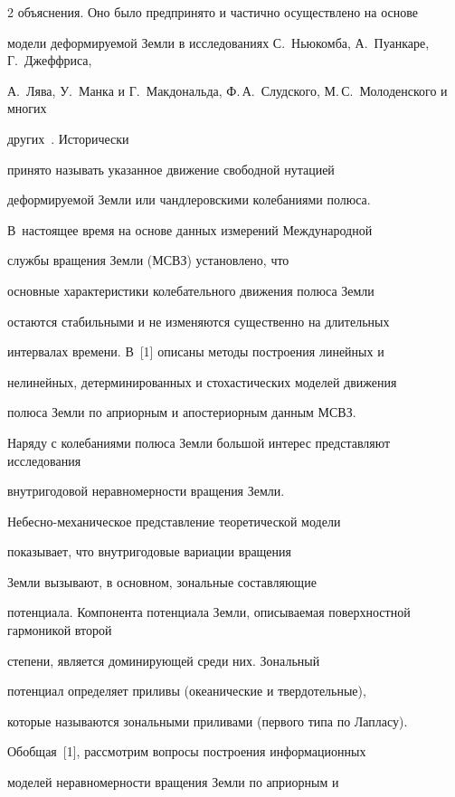 \begin{multicols}{2}
объяснения. Оно было предпринято и частично осуществлено на основе


модели деформируемой Земли в исследованиях С.~Ньюкомба, А.~Пуанкаре, Г.~Джеффриса, 


А.~Лява, У.~Манка и Г.~Макдональда, Ф.\,А.~Слудского, М.\,С.~Молоденского и многих 


других~\cite{6-mar}.  Исторически


принято называть указанное движение свободной нутацией


деформируемой Земли или чандлеровскими колебаниями полюса.


В~настоящее время на основе данных измерений Международной 


службы вращения Земли (МСВЗ) установлено, что


основные характеристики колебательного движения полюса Земли


остаются стабильными и не изменяются существенно на длительных


интервалах времени. В~[1] описаны методы построения линейных и 


нелинейных, детерминированных и стохастических моделей движения 


полюса Земли по априорным и апостериорным данным МСВЗ.





Наряду с колебаниями полюса Земли большой интерес представляют исследования


внутригодовой неравномерности вращения Земли.


Небесно-ме\-ха\-ни\-че\-ское представление теоретической модели


показывает, что внутригодовые вариации вращения


Земли вызывают, в основном, зональные составляющие 


потенциала. Компонента потенциала Земли, описываемая поверхностной гармоникой второй


степени, является доминирующей среди них. Зональный


потенциал определяет приливы (океанические и твердотельные),


которые называются зональными приливами (первого типа по Лапласу).





Обобщая~[1], рассмотрим вопросы построения информационных


моделей неравномерности вращения Земли по априорным и 



\end{multicols}
